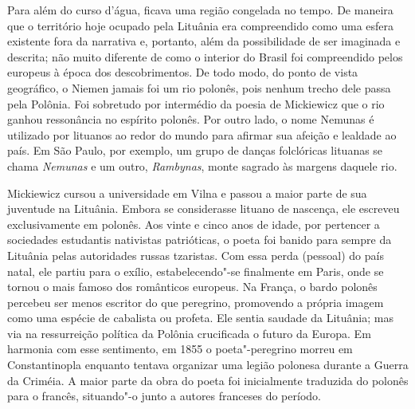 {Para além do curso d'água, ficava uma região congelada no tempo. De
maneira que o território hoje ocupado pela Lituânia era compreendido
como uma esfera existente fora da narrativa e, portanto, além da
possibilidade de ser imaginada e descrita; não muito diferente de como o
interior do Brasil foi compreendido pelos europeus à época dos
descobrimentos. De todo modo, do ponto de vista geográfico, o Niemen
jamais foi um rio polonês, pois nenhum trecho dele passa pela Polônia.
Foi sobretudo por intermédio da poesia de Mickiewicz que o rio ganhou
ressonância no espírito polonês. Por outro lado, o nome Nemunas é
utilizado por lituanos ao redor do mundo para afirmar sua afeição e
lealdade ao país. Em São Paulo, por exemplo, um grupo de danças
folclóricas lituanas se chama \textit{Nemunas} e um outro,
\textit{Rambynas}, monte sagrado às margens daquele rio.

Mickiewicz cursou a universidade em Vilna e passou a maior parte de sua
juventude na Lituânia. Embora se considerasse lituano de nascença, ele
escreveu exclusivamente em polonês. Aos vinte e cinco anos de idade, por
pertencer a sociedades estudantis nativistas patrióticas, o poeta foi
banido para sempre da Lituânia pelas autoridades russas tzaristas. Com
essa perda (pessoal) do país natal, ele partiu para o exílio,
estabelecendo"-se finalmente em Paris, onde se tornou o mais famoso dos
românticos europeus. Na França, o bardo polonês percebeu ser menos
escritor do que peregrino, promovendo a própria imagem como uma espécie
de cabalista ou profeta. Ele sentia saudade da Lituânia; mas via na
ressurreição política da Polônia crucificada o futuro da Europa. Em
harmonia com esse sentimento, em 1855 o poeta"-peregrino morreu em
Constantinopla enquanto tentava organizar uma legião polonesa durante a
Guerra da Criméia. A maior parte da obra do poeta foi inicialmente
traduzida do polonês para o francês, situando"-o junto a autores
franceses do período.

}
